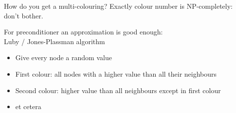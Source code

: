 \begin{frame}{How do you get a multi-colouring?}
  Exactly colour number is NP-completely: don't bother.

  For preconditioner an approximation is good enough:\\
  Luby / Jones-Plassman algorithm
  \begin{itemize}
  \item Give every node a random value
  \item First colour: all nodes with a higher value than all their neighbours
  \item Second colour: higher value than all neighbours except in first colour
  \item et cetera
  \end{itemize}
\end{frame}

